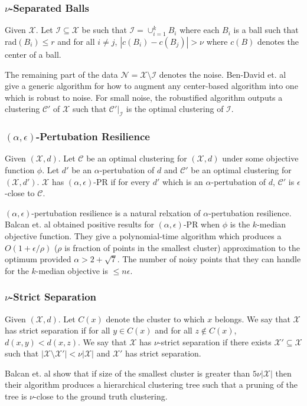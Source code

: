 \documentclass[11pt]{article}
\newcommand{\mc}{\mathcal}
\begin{document}
\subsubsection*{$\nu$-Separated Balls \cite{ben2014clustering}}
\begin{definition}
Given $\mc X$. Let $\mc I \subseteq \mc X$ be such that $\mc I = \cup_{i=1}^k B_i$ where each $B_i$ is a ball such that rad$(B_i) \le r$ and for all $i \neq j$, $|c(B_i)-c(B_j)| > \nu$ where $c(B)$ denotes the center of a ball.
\end{definition}
The remaining part of the data $\mc N = \mc X \setminus \mc I$ denotes the noise. Ben-David et. al \cite{ben2014clustering} give a generic algorithm for how to augment any center-based algorithm into one which is robust to noise. For small noise, the robustified algorithm outputs a clustering $\mc C'$ of $\mc X$ such that $\mc C'|_{\mc I}$ is the optimal clustering of $\mc I$.

\subsubsection*{$(\alpha, \epsilon)$-Pertubation Resilience \cite{balcan2012clustering}}
\begin{definition}
Given $(\mc X, d)$. Let $\mc C$ be an optimal clustering for $(\mc X, d)$ under some objective function $\phi$. Let $d'$ be an $\alpha$-pertubation of $d$ and $\mc C'$ be an optimal clustering for $(\mc X, d')$. $\mc X$ has $(\alpha, \epsilon)$-PR if for every $d'$ which is an $\alpha$-pertubation of $d$, $\mc C'$ is $\epsilon$-close to $\mc C$.
\end{definition}
$(\alpha, \epsilon)$-pertubation resilience is a natural relxation of $\alpha$-pertubation resilience. Balcan et. al \cite{balcan2012clustering} obtained positive results for $(\alpha, \epsilon)$-PR when $\phi$ is the $k$-median objective function. They give a polynomial-time algorithm which produces a $O(1+\epsilon/\rho)$ ($\rho$ is fraction of points in the smallest cluster) approximation to the optimum provided $\alpha > 2 + \sqrt{7}$. The number of noisy points that they can handle for the $k$-median objective is $\le n\epsilon$.

\subsubsection*{$\nu$-Strict Separation \cite{balcan2008discriminative}}
\begin{definition}
Given $(\mc X, d)$. Let $C(x)$ denote the cluster to which $x$ belongs. We say that $\mc X$ has strict separation if for all $y \in C(x)$ and for all $z \not\in C(x)$, $d(x,y) < d(x,z)$. We say that $\mc X$ has $\nu$-strict separation if there exists $\mc X' \subseteq \mc X$ such that $|\mc X\setminus \mc X'| < \nu|\mc X|$ and $\mc X'$ has strict separation.
\end{definition}
Balcan et. al \cite{balcan2008discriminative} show that if size of the smallest cluster is greater than $5\nu|\mc X|$ then their algorithm produces a hierarchical clustering tree such that a pruning of the tree is $\nu$-close to the ground truth clustering. 
\end{document}
